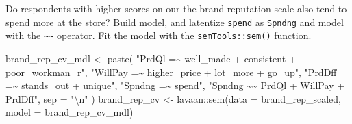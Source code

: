 \documentclass[
]{book}
\newenvironment{Shaded}{\begin{snugshade}}{\end{snugshade}}
\newcommand{\AttributeTok}[1]{\textcolor[rgb]{0.77,0.63,0.00}{#1}}
\newcommand{\CommentTok}[1]{\textcolor[rgb]{0.56,0.35,0.01}{\textit{#1}}}
\newcommand{\DecValTok}[1]{\textcolor[rgb]{0.00,0.00,0.81}{#1}}
\newcommand{\FunctionTok}[1]{\textcolor[rgb]{0.00,0.00,0.00}{#1}}
\newcommand{\NormalTok}[1]{#1}
\newcommand{\OtherTok}[1]{\textcolor[rgb]{0.56,0.35,0.01}{#1}}
\newcommand{\SpecialCharTok}[1]{\textcolor[rgb]{0.00,0.00,0.00}{#1}}
\newcommand{\StringTok}[1]{\textcolor[rgb]{0.31,0.60,0.02}{#1}}
\theoremstyle{definition}
\theoremstyle{definition}
\theoremstyle{definition}
\theoremstyle{definition}
\theoremstyle{remark}
\begin{document}
\begin{Shaded}
\end{Shaded}

Do respondents with higher scores on our the brand reputation scale also tend to spend more at the store? Build model, and latentize \texttt{spend} as \texttt{Spndng} and model with the \texttt{\textasciitilde{}\textasciitilde{}} operator. Fit the model with the \texttt{semTools::sem()} function.

\begin{Shaded}
\begin{Highlighting}[]
\NormalTok{brand\_rep\_cv\_mdl }\OtherTok{\textless{}{-}} \FunctionTok{paste}\NormalTok{(}
  \StringTok{"PrdQl =\textasciitilde{} well\_made + consistent + poor\_workman\_r"}\NormalTok{,}
  \StringTok{"WillPay =\textasciitilde{} higher\_price + lot\_more + go\_up"}\NormalTok{,}
  \StringTok{"PrdDff =\textasciitilde{} stands\_out + unique"}\NormalTok{,}
  \StringTok{"Spndng =\textasciitilde{} spend"}\NormalTok{,}
  \StringTok{"Spndng \textasciitilde{}\textasciitilde{} PrdQl + WillPay + PrdDff"}\NormalTok{,}
  \AttributeTok{sep =} \StringTok{"}\SpecialCharTok{\textbackslash{}n}\StringTok{"}
\NormalTok{)}
\NormalTok{brand\_rep\_cv }\OtherTok{\textless{}{-}}\NormalTok{ lavaan}\SpecialCharTok{::}\FunctionTok{sem}\NormalTok{(}\AttributeTok{data =}\NormalTok{ brand\_rep\_scaled, }\AttributeTok{model =}\NormalTok{ brand\_rep\_cv\_mdl)}
\end{Highlighting}
\end{Shaded}
\end{document}
